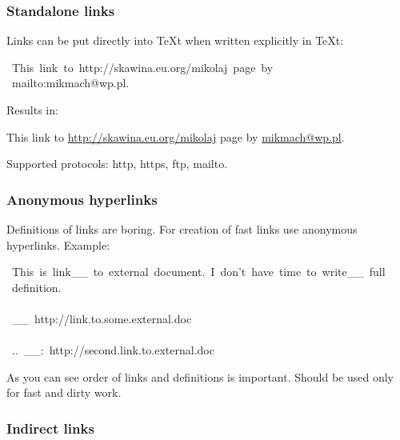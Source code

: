 \documentclass[12pt]{article}
\begin{document}
\subsubsection{Standalone links}

Links can be put directly into \TeX{}t when written explicitly in \TeX{}t:

\begin{ttfamily}\begin{flushleft}
\mbox{~This~link~to~http://skawina.eu.org/mikolaj~page~by}\\
\mbox{~mailto:mikmach@wp.pl.}\\
\end{flushleft}\end{ttfamily}

Results in:

This link to \href{http://skawina.eu.org/mikolaj}{http://skawina.eu.org/mikolaj} page by \href{mailto:mikmach@wp.pl}{mikmach@wp.pl}.

Supported protocols: http, https, ftp, mailto.

\hypertarget{lanonymous-hyperlinks}{}
\subsubsection{Anonymous hyperlinks}

Definitions of links are boring. For creation of fast links use anonymous
hyperlinks. Example:

\begin{ttfamily}\begin{flushleft}
\mbox{~This~is~link\_\_~to~external~document.~I~don't~have~time~to~write\_\_~full}\\
\mbox{~definition.}\\
\mbox{}\\
\mbox{~\_\_~http://link.to.some.external.doc}\\
\mbox{}\\
\mbox{~..~\_\_:~http://second.link.to.external.doc}\\
\end{flushleft}\end{ttfamily}

As you can see order of links and definitions is important. Should be used
only for fast and dirty work.

\hypertarget{lindirect-links}{}
\subsubsection{Indirect links}
\end{document}
